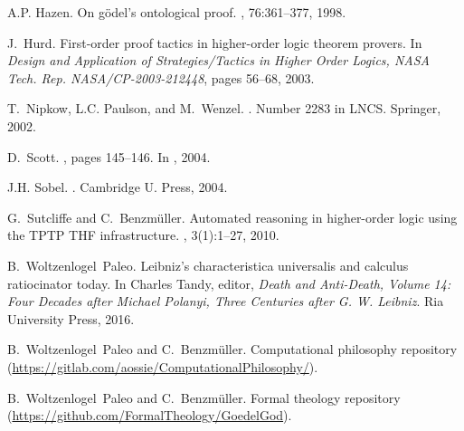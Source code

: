 \documentclass{llncs}
\begin{document}
\begin{thebibliography}{10}
A.P. Hazen.
\newblock On g\"odel's ontological proof.
, 76:361--377, 1998.

J.~Hurd.
\newblock First-order proof tactics in higher-order logic theorem provers.
\newblock In {\em Design and Application of Strategies/Tactics in Higher Order
  Logics, NASA Tech. Rep. NASA/CP-2003-212448}, pages 56--68, 2003.

T.~Nipkow, L.C. Paulson, and M.~Wenzel.
.
\newblock Number 2283 in LNCS. Springer, 2002.

D.~Scott.
, pages 145--146.
\newblock In  \cite{sobel2004logic}, 2004.

J.H. Sobel.
.
\newblock Cambridge U. Press, 2004.

G.~Sutcliffe and C.~Benzm{\"u}ller.
\newblock Automated reasoning in higher-order logic using the {TPTP THF}
  infrastructure.
, 3(1):1--27, 2010.

B.~Woltzenlogel~Paleo.
\newblock Leibniz's characteristica universalis and calculus ratiocinator
  today.
\newblock In Charles Tandy, editor, {\em Death and Anti-Death, Volume 14: Four
  Decades after Michael Polanyi, Three Centuries after G. W. Leibniz}. Ria
  University Press, 2016.

B.~Woltzenlogel~Paleo and C.~Benzm\"uller.
\newblock Computational philosophy repository
  (\url{https://gitlab.com/aossie/ComputationalPhilosophy/}).

B.~Woltzenlogel~Paleo and C.~Benzm\"uller.
\newblock Formal theology repository
  (\url{https://github.com/FormalTheology/GoedelGod}).

\end{thebibliography}



%
%


%
%
\end{document}
